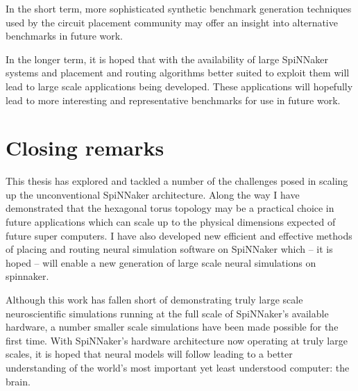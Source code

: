 			In the short term, more sophisticated synthetic benchmark generation
			techniques used by the circuit placement community \cite{nam07} may offer
			an insight into alternative benchmarks in future work.
			
			In the longer term, it is hoped that with the availability of large
			SpiNNaker systems and placement and routing algorithms better suited to
			exploit them will lead to large scale applications being developed. These
			applications will hopefully lead to more interesting and representative
			benchmarks for use in future work.
	
	\section{Closing remarks}
		
		This thesis has explored and tackled a number of the challenges posed in
		scaling up the unconventional SpiNNaker architecture. Along the way I have
		demonstrated that the hexagonal torus topology may be a practical choice in
		future applications which can scale up to the physical dimensions expected
		of future super computers. I have also developed new efficient and
		effective methods of placing and routing neural simulation software on
		SpiNNaker which -- it is hoped -- will enable a new generation of large
		scale neural simulations on spinnaker.
		
		Although this work has fallen short of demonstrating truly large scale
		neuroscientific simulations running at the full scale of SpiNNaker's
		available hardware, a number smaller scale simulations have been made
		possible for the first time. With SpiNNaker's hardware architecture now
		operating at truly large scales, it is hoped that neural models will follow
		leading to a better understanding of the world's most important yet least
		understood computer: the brain.
